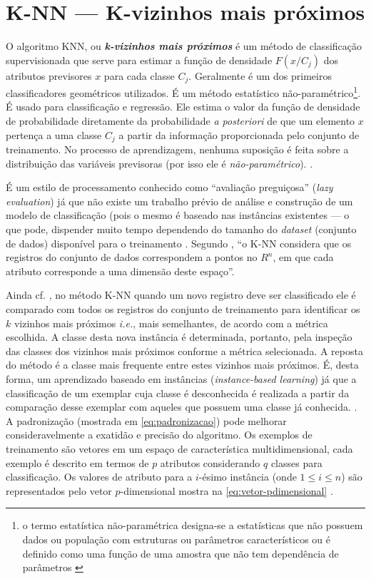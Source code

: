 \section{K-NN --- K-vizinhos mais próximos}\label{sec:knn}
O algoritmo KNN, ou \textit{\textbf{k-vizinhos mais próximos}} é um método de classificação supervisionada que serve para estimar a função de densidade $ F(x/C_j) $ dos atributos previsores $ x $ para cada classe $ C_j $. Geralmente é um dos primeiros classificadores geométricos utilizados. É um método estatístico não-paramétrico\footnote{o termo estatística não-paramétrica designa-se a estatísticas que não possuem dados ou população com estruturas ou parâmetros característicos ou é definido como uma função de uma amostra que não tem dependência de parâmetros \cite{bruce_estatistica_2019}}. É usado para classificação e regressão. Ele estima o valor da função de densidade de probabilidade diretamente da probabilidade \textit{a posteriori} de que um elemento $x$ pertença a uma classe $C_j$ a partir da informação proporcionada pelo conjunto de treinamento. No processo de aprendizagem, nenhuma suposição é feita sobre a distribuição das variáveis previsoras (por isso ele é \textit{não-paramétrico}). \cite{Boscarioli2017} \cite{goldschmidt2005} \cite{wu2007} \cite{bruce_estatistica_2019}. 

É um estilo de processamento conhecido como ``avaliação preguiçosa'' (\textit{lazy evaluation}) já que não existe um trabalho prévio de análise e construção de um modelo de classificação (pois o mesmo é baseado nas instâncias existentes --- o que pode, dispender muito tempo dependendo do tamanho do \textit{dataset} (conjunto de dados) disponível para o treinamento \cite{Boscarioli2017}. Segundo \cite{goldschmidt2005}, ``o K-NN considera que os registros do conjunto de dados correspondem a pontos no $R^n$, em que cada atributo corresponde a uma dimensão deste espaço''.

Ainda cf. , no método K-NN quando um novo registro deve ser classificado ele é comparado com todos os registros do conjunto de treinamento para identificar os $k$ vizinhos mais próximos  \textit{i.e.}, mais semelhantes, de acordo com a métrica escolhida. A classe desta nova instância é determinada, portanto, pela inspeção das classes dos vizinhos mais próximos conforme a métrica selecionada. A reposta do método é a classe mais frequente entre estes vizinhos mais próximos. É, desta forma, um aprendizado baseado em instâncias (\textit{instance-based learning}) já que a classificação de um exemplar cuja classe é desconhecida é realizada a partir da comparação desse exemplar com aqueles que possuem uma classe já conhecida. \cite[p. 80]{Boscarioli2017}. A padronização (mostrada em \autoref{eq:padronizacao}) pode melhorar consideravelmente a exatidão e precisão do algoritmo. Os exemplos de treinamento são vetores em um espaço de característica multidimensional, cada exemplo é descrito em termos de $p$ atributos considerando $q$  classes para classificação. Os valores de atributo para a  $i$-ésimo instância (onde $1 \leq i \leq n$) são representados pelo vetor $p$-dimensional mostra na \autoref{eq:vetor-pdimensional} \cite{bruce_estatistica_2019} \cite{alpaydin_introduction_2014} \cite{classification2013}.

